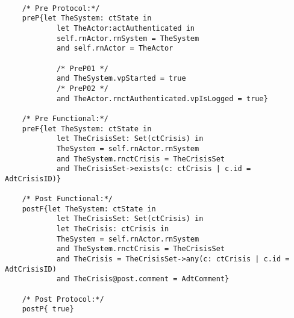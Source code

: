	\scriptsize
	\vspace{0.5cm}
	\begin{lstlisting}[style=MessirStyle,firstnumber=auto,captionpos=b,caption={\msrmessir (MCL-oriented) specification of the operation \emph{oeReportOnCrisis}.},label=OM-actCoordinator-oeReportOnCrisis-MCL-LST]

	/* Pre Protocol:*/ 
	preP{let TheSystem: ctState in
	  		let TheActor:actAuthenticated in
	  		self.rnActor.rnSystem = TheSystem
	  		and self.rnActor = TheActor
	  
			/* PreP01 */
	  		and TheSystem.vpStarted = true
			/* PreP02 */
	  		and TheActor.rnctAuthenticated.vpIsLogged = true}
	
	/* Pre Functional:*/
	preF{let TheSystem: ctState in
			let TheCrisisSet: Set(ctCrisis) in
			TheSystem = self.rnActor.rnSystem
			and TheSystem.rnctCrisis = TheCrisisSet
			and TheCrisisSet->exists(c: ctCrisis | c.id = AdtCrisisID)}
	
	/* Post Functional:*/ 
	postF{let TheSystem: ctState in
			let TheCrisisSet: Set(ctCrisis) in
			let TheCrisis: ctCrisis in
			TheSystem = self.rnActor.rnSystem
			and TheSystem.rnctCrisis = TheCrisisSet
			and TheCrisis = TheCrisisSet->any(c: ctCrisis | c.id = AdtCrisisID)
			and TheCrisis@post.comment = AdtComment}
	
	/* Post Protocol:*/ 
	postP{ true}
	
	\end{lstlisting}
	\normalsize 
	
	
	
	





